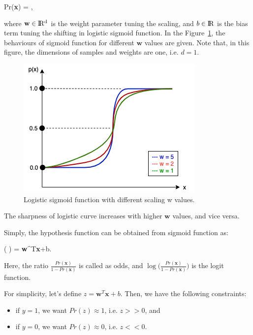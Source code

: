 \be
\label{eq:logistic_p}
Pr(\textbf{x}) = \:,
\ee

where $\textbf{w} \in \rm I\!R^{d}$ is the weight parameter tuning the scaling, and $b \in \rm I\!R$ is the bias term tuning the shifting in logistic sigmoid function. In the Figure~\ref{logistic_function}, the behaviours of sigmoid function for different $\textbf{w}$ values are given. Note that, in this figure, the dimensions of samples and weights are one, i.e. $d = 1$.

\begin{figure}[h]
	\centering
	\includegraphics[width=.6\linewidth]{fig/logistic_function.png}
	\vspace*{2mm}
	\caption{Logistic sigmoid function with different scaling w values. }
	\label{logistic_function}
\end{figure}

The sharpness of logistic curve increases with higher $\textbf{w}$ values, and vice versa.

Simply, the hypothesis function can be obtained from sigmoid function as:

\be
\label{eq:logistic_hyptothesis}
\ln \Big ( \Big ) = \textbf{w}^{T}\textbf{x}+b\:.
\ee

Here, the ratio $\frac{Pr(\textbf{x})}{1 - Pr(\textbf{x})}$ is called as odds, and $\log \Big (\frac{Pr(\textbf{x})}{1 - Pr(\textbf{x})} \Big )$ is the logit function.

For simplicity, let's define $z = \textbf{w}^{T}\textbf{x}+b$. Then, we have the following constraints:

\begin{itemize}
    \item if $y = 1$, we want $Pr(z) \approx 1$, i.e. $z >> 0$, and
    \item if $y = 0$, we want $Pr(z) \approx 0$, i.e. $z << 0$.
\end{itemize}

